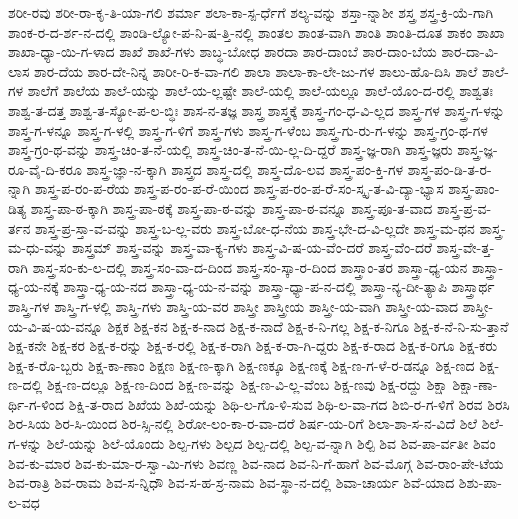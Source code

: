{ಶರೀ-ರವು
ಶರೀ-ರಾ-ಕೃ-ತಿ-ಯಾ-ಗಲಿ
ಶರ್ಮಾ
ಶಲಾ-ಕಾ-ಸ್ಪ-ರ್ಧೆಗೆ
ಶಲ್ಯ-ವನ್ನು
ಶಸ್ತಾ-ನ್ನಾಶೀ
ಶಸ್ತ್ರ
ಶಸ್ತ್ರ-ಕ್ರಿ-ಯೆ-ಗಾಗಿ
ಶಾಂಕ-ರ-ದ-ರ್ಶ-ನ-ದಲ್ಲಿ
ಶಾಂಡಿ-ಲ್ಯೋ-ಪ-ನಿ-ಷ-ತ್ತಿ-ನಲ್ಲಿ
ಶಾಂತಲ
ಶಾಂತ-ವಾಗಿ
ಶಾಂತಿ
ಶಾಂತಿ-ದೂತ
ಶಾಕಂ
ಶಾಖಾ
ಶಾಖಾ-ಧ್ಯಾ-ಯಿ-ಗ-ಳಾದ
ಶಾಖೆ
ಶಾಖೆ-ಗಳು
ಶಾಬ್ಧ-ಬೋಧ
ಶಾರದಾ
ಶಾರ-ದಾಂಬೆ
ಶಾರ-ದಾಂ-ಬೆಯ
ಶಾರ-ದಾ-ವಿ-ಲಾಸ
ಶಾರ-ದೆಯ
ಶಾರ-ದೇ-ನಿನ್ನ
ಶಾರೀ-ರಿ-ಕ-ವಾ-ಗಲಿ
ಶಾಲಾ
ಶಾಲಾ-ಕಾ-ಲೇ-ಜು-ಗಳ
ಶಾಲು-ಹೊ-ದಿಸಿ
ಶಾಲೆ
ಶಾಲೆ-ಗಳ
ಶಾಲೆಗೆ
ಶಾಲೆಯ
ಶಾಲೆ-ಯನ್ನು
ಶಾಲೆ-ಯ-ಲ್ಲಷ್ಟೇ
ಶಾಲೆ-ಯಲ್ಲಿ
ಶಾಲೆ-ಯಲ್ಲೂ
ಶಾಲೆ-ಯೊಂ-ದ-ರಲ್ಲಿ
ಶಾಶ್ವತಃ
ಶಾಶ್ವ-ತ-ದತ್ತ
ಶಾಶ್ವ-ತ-ಸ್ಯೋ-ಪ-ಲ-ಬ್ಧಿಃ
ಶಾಸ-ನ-ತಜ್ಞ
ಶಾಸ್ತ್ರ
ಶಾಸ್ತ್ರಕ್ಕೆ
ಶಾಸ್ತ್ರ-ಗಂ-ಧ-ವಿ-ಲ್ಲದ
ಶಾಸ್ತ್ರ-ಗಳ
ಶಾಸ್ತ್ರ-ಗ-ಳನ್ನು
ಶಾಸ್ತ್ರ-ಗ-ಳನ್ನೂ
ಶಾಸ್ತ್ರ-ಗ-ಳಲ್ಲಿ
ಶಾಸ್ತ್ರ-ಗ-ಳಿಗೆ
ಶಾಸ್ತ್ರ-ಗಳು
ಶಾಸ್ತ್ರ-ಗ-ಳೆಂಬ
ಶಾಸ್ತ್ರ-ಗು-ರು-ಗ-ಳನ್ನು
ಶಾಸ್ತ್ರ-ಗ್ರಂ-ಥ-ಗಳ
ಶಾಸ್ತ್ರ-ಗ್ರಂ-ಥ-ವನ್ನು
ಶಾಸ್ತ್ರ-ಚಿಂ-ತ-ನೆ-ಯಲ್ಲಿ
ಶಾಸ್ತ್ರ-ಚಿಂ-ತ-ನೆ-ಯಿ-ಲ್ಲ-ದಿ-ದ್ದರೆ
ಶಾಸ್ತ್ರ-ಜ್ಞ-ರಾಗಿ
ಶಾಸ್ತ್ರ-ಜ್ಞರು
ಶಾಸ್ತ್ರ-ಜ್ಞ-ರೂ-ವೈ-ದಿ-ಕರೂ
ಶಾಸ್ತ್ರ-ಜ್ಞಾ-ನ-ಕ್ಕಾಗಿ
ಶಾಸ್ತ್ರದ
ಶಾಸ್ತ್ರ-ದಲ್ಲಿ
ಶಾಸ್ತ್ರ-ದೊ-ಲವ
ಶಾಸ್ತ್ರ-ಪಂ-ಕ್ತಿ-ಗಳ
ಶಾಸ್ತ್ರ-ಪಂ-ಡಿ-ತ-ರ-ನ್ನಾಗಿ
ಶಾಸ್ತ್ರ-ಪ-ರಂ-ಪ-ರೆಯ
ಶಾಸ್ತ್ರ-ಪ-ರಂ-ಪ-ರೆ-ಯಿಂದ
ಶಾಸ್ತ್ರ-ಪ-ರಂ-ಪ-ರೆ-ಸಂ-ಸ್ಕೃ-ತ-ವಿ-ದ್ಯಾ-ಭ್ಯಾಸ
ಶಾಸ್ತ್ರ-ಪಾಂ-ಡಿತ್ಯ
ಶಾಸ್ತ್ರ-ಪಾ-ಠ-ಕ್ಕಾಗಿ
ಶಾಸ್ತ್ರ-ಪಾ-ಠಕ್ಕೆ
ಶಾಸ್ತ್ರ-ಪಾ-ಠ-ವನ್ನು
ಶಾಸ್ತ್ರ-ಪಾ-ಠ-ವನ್ನೂ
ಶಾಸ್ತ್ರ-ಪೂ-ತ-ವಾದ
ಶಾಸ್ತ್ರ-ಪ್ರ-ವ-ರ್ತನ
ಶಾಸ್ತ್ರ-ಪ್ರ-ಸ್ತಾ-ವ-ವನ್ನು
ಶಾಸ್ತ್ರ-ಬ-ಲ್ಲ-ವರು
ಶಾಸ್ತ್ರ-ಬೋ-ಧ-ನೆಯ
ಶಾಸ್ತ್ರ-ಭೇ-ದ-ವಿ-ಲ್ಲದೇ
ಶಾಸ್ತ್ರ-ಮ-ಥನ
ಶಾಸ್ತ್ರ-ಮ-ಧು-ವನ್ನು
ಶಾಸ್ತ್ರಮ್
ಶಾಸ್ತ್ರ-ವನ್ನು
ಶಾಸ್ತ್ರ-ವಾ-ಕ್ಯ-ಗಳು
ಶಾಸ್ತ್ರ-ವಿ-ಷ-ಯ-ವೆಂ-ದರೆ
ಶಾಸ್ತ್ರ-ವೆಂ-ದರೆ
ಶಾಸ್ತ್ರ-ವೇ-ತ್ತ-ರಾಗಿ
ಶಾಸ್ತ್ರ-ಸಂ-ಕು-ಲ-ದಲ್ಲಿ
ಶಾಸ್ತ್ರ-ಸಂ-ವಾ-ದ-ದಿಂದ
ಶಾಸ್ತ್ರ-ಸಂ-ಸ್ಕಾ-ರ-ದಿಂದ
ಶಾಸ್ತ್ರಾಂ-ತರ
ಶಾಸ್ತ್ರಾ-ಧ್ಯ-ಯನ
ಶಾಸ್ತ್ರಾ-ಧ್ಯ-ಯ-ನಕ್ಕೆ
ಶಾಸ್ತ್ರಾ-ಧ್ಯ-ಯ-ನದ
ಶಾಸ್ತ್ರಾ-ಧ್ಯ-ಯ-ನ-ವನ್ನು
ಶಾಸ್ತ್ರಾ-ಧ್ಯಾ-ಪ-ನ-ದಲ್ಲಿ
ಶಾಸ್ತ್ರಾ-ನ್ಯ-ದೀ-ತ್ಯಾಪಿ
ಶಾಸ್ತ್ರಾರ್ಥ
ಶಾಸ್ತ್ರಿ-ಗಳ
ಶಾಸ್ತ್ರಿ-ಗ-ಳಲ್ಲಿ
ಶಾಸ್ತ್ರಿ-ಗಳು
ಶಾಸ್ತ್ರಿ-ಯ-ವರ
ಶಾಸ್ತ್ರೀ
ಶಾಸ್ತ್ರೀಯ
ಶಾಸ್ತ್ರೀ-ಯ-ವಾಗಿ
ಶಾಸ್ತ್ರೀ-ಯ-ವಾದ
ಶಾಸ್ತ್ರೀ-ಯ-ವಿ-ಷ-ಯ-ವನ್ನೂ
ಶಿಕ್ಷಕ
ಶಿಕ್ಷ-ಕನ
ಶಿಕ್ಷ-ಕ-ನಾದ
ಶಿಕ್ಷ-ಕ-ನಾದೆ
ಶಿಕ್ಷ-ಕ-ನಿ-ಗಲ್ಲ
ಶಿಕ್ಷ-ಕ-ನಿಗೂ
ಶಿಕ್ಷ-ಕ-ನೆ-ನಿ-ಸು-ತ್ತಾನೆ
ಶಿಕ್ಷ-ಕನೇ
ಶಿಕ್ಷ-ಕರ
ಶಿಕ್ಷ-ಕ-ರನ್ನು
ಶಿಕ್ಷ-ಕ-ರಲ್ಲಿ
ಶಿಕ್ಷ-ಕ-ರಾಗಿ
ಶಿಕ್ಷ-ಕ-ರಾ-ಗಿ-ದ್ದರು
ಶಿಕ್ಷ-ಕ-ರಾದ
ಶಿಕ್ಷ-ಕ-ರಿಗೂ
ಶಿಕ್ಷ-ಕರು
ಶಿಕ್ಷ-ಕ-ರೊ-ಬ್ಬರು
ಶಿಕ್ಷ-ಕಾ-ಣಾಂ
ಶಿಕ್ಷಣ
ಶಿಕ್ಷ-ಣ-ಕ್ಕಾಗಿ
ಶಿಕ್ಷ-ಣಕ್ಕೂ
ಶಿಕ್ಷ-ಣಕ್ಕೆ
ಶಿಕ್ಷ-ಣ-ಗ-ಳೆ-ರ-ಡನ್ನೂ
ಶಿಕ್ಷ-ಣದ
ಶಿಕ್ಷ-ಣ-ದಲ್ಲಿ
ಶಿಕ್ಷ-ಣ-ದಲ್ಲೂ
ಶಿಕ್ಷ-ಣ-ದಿಂದ
ಶಿಕ್ಷ-ಣ-ವನ್ನು
ಶಿಕ್ಷ-ಣ-ವಿ-ಲ್ಲ-ವೆಂಬ
ಶಿಕ್ಷ-ಣವು
ಶಿಕ್ಷ-ರದ್ದು
ಶಿಕ್ಷಾ
ಶಿಕ್ಷಾ-ಣಾ-ರ್ಥಿ-ಗ-ಳಿಂದ
ಶಿಕ್ಷಿ-ತ-ರಾದ
ಶಿಖೆಯ
ಶಿಖೆ-ಯನ್ನು
ಶಿಥಿ-ಲ-ಗೊ-ಳಿ-ಸುವ
ಶಿಥಿ-ಲ-ವಾ-ಗದ
ಶಿಬಿ-ರ-ಗ-ಳಿಗೆ
ಶಿರವ
ಶಿರಸಿ
ಶಿರ-ಸಿಯ
ಶಿರ-ಸಿ-ಯಿಂದ
ಶಿರ-ಸ್ಸಿ-ನಲ್ಲಿ
ಶಿರೋ-ಲಂ-ಕಾ-ರ-ವಾ-ದರೆ
ಶಿರ್ಷ-ಯ-ರಿಗೆ
ಶಿಲಾ-ಶಾ-ಸ-ನ-ವಿದೆ
ಶಿಲೆ
ಶಿಲೆ-ಗ-ಳನ್ನು
ಶಿಲೆ-ಯನ್ನು
ಶಿಲೆ-ಯೊಂದು
ಶಿಲ್ಪ-ಗಳು
ಶಿಲ್ಪದ
ಶಿಲ್ಪ-ದಲ್ಲಿ
ಶಿಲ್ಪ-ವ-ನ್ನಾಗಿ
ಶಿಲ್ಪಿ
ಶಿವ
ಶಿವ-ಪಾ-ರ್ವತೀ
ಶಿವಂ
ಶಿವ-ಕು-ಮಾರ
ಶಿವ-ಕು-ಮಾ-ರ-ಸ್ವಾ-ಮಿ-ಗಳು
ಶಿವಣ್ಣ
ಶಿವ-ನಾದ
ಶಿವ-ನಿ-ಗೆ-ಹಾಗೆ
ಶಿವ-ಮೊಗ್ಗ
ಶಿವ-ರಾಂ-ಪೇ-ಟೆಯ
ಶಿವ-ರಾತ್ರಿ
ಶಿವ-ರಾಮ
ಶಿವ-ಸ-ನ್ನಿಧೌ
ಶಿವ-ಸ-ಹ-ಸ್ರ-ನಾಮ
ಶಿವ-ಸ್ಥಾ-ನ-ದಲ್ಲಿ
ಶಿವಾ-ಚಾರ್ಯ
ಶಿವೆ-ಯಾದ
ಶಿಶು-ಪಾ-ಲ-ವಧ
}
